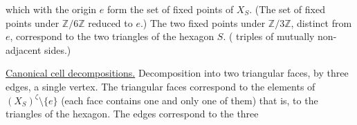 
which with the origin $e$ form the set of fixed points of $X_S$. (The set of fixed points under $\mathbb Z/6\mathbb Z$  reduced to $e$.) The two fixed points under $\mathbb Z/3\mathbb Z$, distinct from $e$, correspond to the two  triangles of the hexagon $S$. ( triples of mutually non-adjacent sides.)

\uline{Canonical cell decompositions.} Decomposition into two triangular faces, by three edges, a single vertex. The triangular faces correspond to the elements of $(X_S)^\zeta\setminus\{e\}$ (each face contains one and only one of them) that is, to the  triangles of the hexagon. The edges correspond to the three

